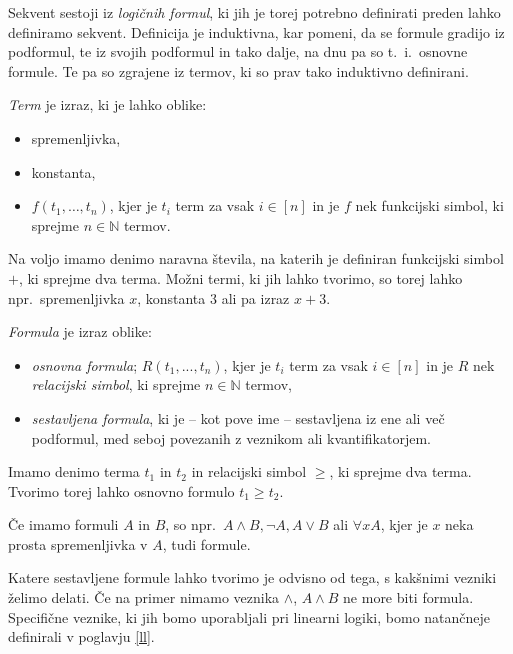 Sekvent sestoji iz \emph{logičnih formul}, ki jih je torej potrebno definirati preden lahko definiramo sekvent. Definicija je induktivna, kar pomeni, da se formule gradijo iz podformul, te iz svojih podformul in tako dalje, na dnu pa so t.~i.\ osnovne formule. Te pa so zgrajene iz termov, ki so prav tako induktivno definirani.
\begin{definicija}
    \emph{Term} je izraz, ki je lahko oblike:
    \begin{itemize}
        \item spremenljivka,
        \item konstanta,
        \item $f(t_1,\ldots,t_n)$, kjer je $t_i$ term za vsak $i\in [n]$ in je $f$ nek funkcijski simbol, ki sprejme $n\in \mathbb{N}$ termov.
    \end{itemize}
\end{definicija}
\begin{primer*}
    Na voljo imamo denimo naravna števila, na katerih je definiran funkcijski simbol $+$, ki sprejme dva terma. Možni termi, ki jih lahko tvorimo, so torej lahko npr.\ spremenljivka $x$, konstanta $3$ ali pa izraz $x+3$.
\end{primer*}

\begin{definicija} \label{formula}
	\emph{Formula} je izraz oblike:
	\begin{itemize}
        \item \emph{osnovna formula}; $R(t_1, ..., t_n)$, kjer je $t_i$ term za vsak $i\in [n]$ in je $R$ nek \emph{relacijski simbol}, ki sprejme $n\in\mathbb{N}$ termov,
        \item \emph{sestavljena formula}, ki je -- kot pove ime -- sestavljena iz ene ali več podformul, med seboj povezanih z veznikom ali kvantifikatorjem.
	\end{itemize}
\end{definicija}
\begin{primer*}
    Imamo denimo terma $t_1$ in $t_2$ in relacijski simbol $\geq$, ki sprejme dva terma. Tvorimo torej lahko osnovno formulo $t_1\geq t_2$.
\end{primer*}
\begin{primer*}
    Če imamo formuli $A$ in $B$, so npr.\ $A \land B, \neg A, A \lor B$ ali $\forall x A$, kjer je $x$ neka prosta spremenljivka v $A$, tudi formule.
\end{primer*}
Katere sestavljene formule lahko tvorimo je odvisno od tega, s kakšnimi vezniki želimo delati. Če na primer nimamo veznika $\land$, $A \land B$ ne more biti formula. Specifične veznike, ki jih bomo uporabljali pri linearni logiki, bomo natančneje definirali v poglavju \ref{ll}.

